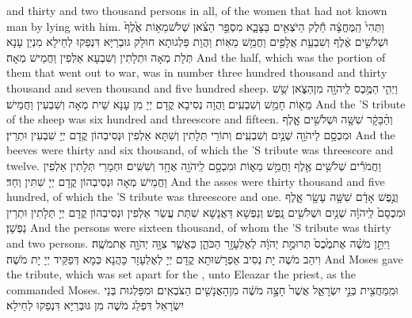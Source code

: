 {and thirty and two thousand persons in all, of the women that had not known man by lying with him.}{}
{וַתְּהִי֙ הַֽמֶּחֱצָ֔ה חֵ֕לֶק הַיֹּצְאִ֖ים בַּצָּבָ֑א מִסְפַּ֣ר הַצֹּ֗אן שְׁלֹשׁ\maqqaf מֵא֥וֹת אֶ֙לֶף֙ וּשְׁלֹשִׁ֣ים אֶ֔לֶף וְשִׁבְעַ֥ת אֲלָפִ֖ים וַחֲמֵ֥שׁ מֵאֽוֹת׃}
{וַהֲוָת פַּלְגוּתָא חוּלָק גּוּבְרַיָּא דִּנְפַקוּ לְחֵילָא מִנְיַן עָנָא תְּלָת מְאָה וּתְלָתִין וְשִׁבְעָא אַלְפִין וַחֲמֵישׁ מְאָה׃}
{And the half, which was the portion of them that went out to war, was in number three hundred thousand and thirty thousand and seven thousand and five hundred sheep.}{}
{וַיְהִ֛י הַמֶּ֥כֶס לַֽיהֹוָ֖ה מִן\maqqaf הַצֹּ֑אן שֵׁ֥שׁ מֵא֖וֹת חָמֵ֥שׁ וְשִׁבְעִֽים׃}
{וַהֲוָה נְסִיבָא קֳדָם יְיָ מִן עָנָא שֵׁית מְאָה וְשִׁבְעִין וַחֲמֵישׁ׃}
{And the \lord’S tribute of the sheep was six hundred and threescore and fifteen.}{}
{וְהַ֨בָּקָ֔ר שִׁשָּׁ֥ה וּשְׁלֹשִׁ֖ים אָ֑לֶף וּמִכְסָ֥ם לַיהֹוָ֖ה שְׁנַ֥יִם וְשִׁבְעִֽים׃}
{וְתוֹרֵי תְּלָתִין וְשִׁתָּא אַלְפִין וּנְסִיבְהוֹן קֳדָם יְיָ שִׁבְעִין וּתְרֵין׃}
{And the beeves were thirty and six thousand, of which the \lord’S tribute was threescore and twelve.}{}
{וַחֲמֹרִ֕ים שְׁלֹשִׁ֥ים אֶ֖לֶף וַחֲמֵ֣שׁ מֵא֑וֹת וּמִכְסָ֥ם לַֽיהֹוָ֖ה אֶחָ֥ד וְשִׁשִּֽׁים׃}
{וּחְמָרֵי תְּלָתִין אַלְפִין וַחֲמֵישׁ מְאָה וּנְסִיבְהוֹן קֳדָם יְיָ שִׁתִּין וְחַד׃}
{And the asses were thirty thousand and five hundred, of which the \lord’S tribute was threescore and one.}{}
{וְנֶ֣פֶשׁ אָדָ֔ם שִׁשָּׁ֥ה עָשָׂ֖ר אָ֑לֶף וּמִכְסָם֙ לַֽיהֹוָ֔ה שְׁנַ֥יִם וּשְׁלֹשִׁ֖ים נָֽפֶשׁ׃}
{וְנַפְשָׁא דַּאֲנָשָׁא שִׁתַּת עֲשַׂר אַלְפִין וּנְסִיבְהוֹן קֳדָם יְיָ תְּלָתִין וּתְרֵין נַפְשָׁן׃}
{And the persons were sixteen thousand, of whom the \lord’S tribute was thirty and two persons.}{}
{וַיִּתֵּ֣ן מֹשֶׁ֗ה אֶת\maqqaf מֶ֙כֶס֙ תְּרוּמַ֣ת יְהֹוָ֔ה לְאֶלְעָזָ֖ר הַכֹּהֵ֑ן כַּאֲשֶׁ֛ר צִוָּ֥ה יְהֹוָ֖ה אֶת\maqqaf מֹשֶֽׁה׃}
{וִיהַב מֹשֶׁה יָת נְסִיב אַפְרָשׁוּתָא קֳדָם יְיָ לְאֶלְעָזָר כָּהֲנָא כְּמָא דְּפַקֵּיד יְיָ יָת מֹשֶׁה׃}
{And Moses gave the tribute, which was set apart for the \lord, unto Eleazar the priest, as the \lord\space commanded Moses.}{}
{וּמִֽמַּחֲצִ֖ית בְּנֵ֣י יִשְׂרָאֵ֑ל אֲשֶׁר֙ חָצָ֣ה מֹשֶׁ֔ה מִן\maqqaf הָאֲנָשִׁ֖ים הַצֹּבְאִֽים׃}
{וּמִפַּלְגוּת בְּנֵי יִשְׂרָאֵל דִּפְלַג מֹשֶׁה מִן גּוּבְרַיָּא דִּנְפַקוּ לְחֵילָא׃}
